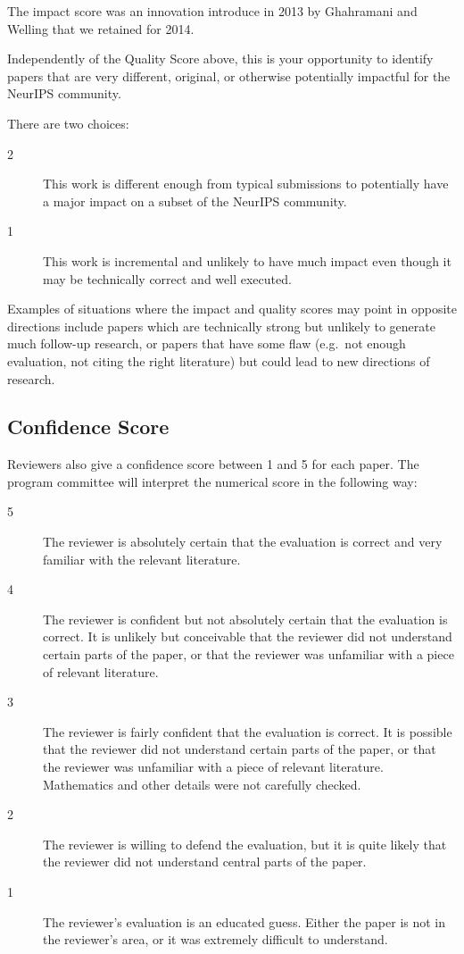 The impact score was an innovation introduce in 2013 by Ghahramani and
Welling that we retained for 2014. 

Independently of the Quality Score above, this is your opportunity to
identify papers that are very different, original, or otherwise
potentially impactful for the NeurIPS community.

There are two choices:

\begin{description}
\item[2] This work is different enough from typical submissions to potentially
have a major impact on a subset of the NeurIPS community.

\item[1] This work is incremental and unlikely to have much impact even though
it may be technically correct and well executed.
\end{description}

Examples of situations where the impact and quality scores may point in
opposite directions include papers which are technically strong but
unlikely to generate much follow-up research, or papers that have some
flaw (e.g.~not enough evaluation, not citing the right literature) but
could lead to new directions of research.


\subsection*{Confidence Score}\label{confidence-score}

Reviewers also give a confidence score between 1 and 5 for each paper.
The program committee will interpret the numerical score in the
following way:

\begin{description}
\item[5] The reviewer is absolutely certain that the evaluation is correct and
very familiar with the relevant literature.

\item[4] The reviewer is confident but not absolutely certain that the
evaluation is correct. It is unlikely but conceivable that the reviewer
did not understand certain parts of the paper, or that the reviewer was
unfamiliar with a piece of relevant literature.

\item[3] The reviewer is fairly confident that the evaluation is correct. It
is possible that the reviewer did not understand certain parts of the
paper, or that the reviewer was unfamiliar with a piece of relevant
literature. Mathematics and other details were not carefully checked.

\item[2] The reviewer is willing to defend the evaluation, but it is quite
likely that the reviewer did not understand central parts of the paper.

\item[1] The reviewer's evaluation is an educated guess. Either the paper is
not in the reviewer's area, or it was extremely difficult to understand.
\end{description}

